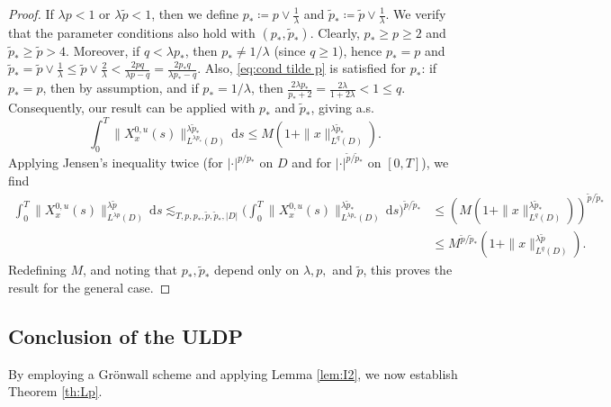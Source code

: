 \documentclass{amsart}
\theoremstyle{plain}
\theoremstyle{remark}
\theoremstyle{plain}
\numberwithin{equation}{section}
\newcommand{\ceqq}{\coloneqq}
\newcommand{\dd}{\,\mathrm{d}}
\begin{document}
\begin{proof}
If $\lambda p<1$ or $\lambda\tilde p<1$, then we define  $p_*\ceqq p\vee \frac{1}{\lambda}$ and $\tilde p_*\ceqq \tilde p\vee \frac{1}{\lambda}$. We verify that the parameter conditions also hold with $(p_*,\tilde p_*)$. Clearly, $p_*\geq p\geq 2$ and $\tilde p_*\geq \tilde p>4$. Moreover, if $q<\lambda p_*$, then $p_*\neq 1/\lambda$ (since $q\geq 1$), hence $p_*=p$ and $\tilde p_*=\tilde p \vee \frac{1}{\lambda}\leq \tilde p\vee \frac{2}{\lambda}<\frac{2pq}{\lambda p-q}=\frac{2p_*q}{\lambda p_*-q}$. Also, \eqref{eq:cond tilde p} is satisfied for $p_*$: if $p_*=p$, then by assumption, and if $p_*=1/\lambda$, then  $\frac{2\lambda p_*}{p_*+2}=\frac{2\lambda}{1+2\lambda}<1\leq q$. 
Consequently, our result can be applied with $p_*$ and $\tilde p_*$, giving a.s.
\[
\int_0^T \|X_x^{0,u}(s)\|_{L^{\lambda p_*}(D)}^{\lambda \tilde p_*}\dd s\leq M(1+\|x\|_{L^q(D)}^{\lambda\tilde p_*}).
\]
Applying Jensen's inequality twice (for $|\cdot|^{ p/ p_*}$ on $D$ and for $|\cdot|^{\tilde p/\tilde p_*}$ on $[0,T]$), we find 
\begin{align*}
\int_0^T \|X_x^{0,u}(s)\|_{L^{\lambda p}(D)}^{\lambda \tilde p}\dd s
    \lesssim_{T,p,p_*,\tilde p,\tilde p_*,|D|}\Big(\int_0^T \|X_x^{0,u}(s)\|_{L^{\lambda p_*}(D)}^{\lambda \tilde p_*}\dd s\Big)^{\tilde p/\tilde p_*}
    &\leq (M(1+\|x\|_{L^q(D)}^{\lambda\tilde p_*}))^{\tilde p/\tilde p_*}\\
    &\leq M^{\tilde p/\tilde p_*}(1+\|x\|_{L^q(D)}^{\lambda\tilde p}).
\end{align*}
Redefining $M$, and noting that $p_*,\tilde p_*$ depend only on $\lambda,p,$ and $\tilde p$, this proves the result for the general case. 
\end{proof}


\subsection{Conclusion of the ULDP}\label{sub:concl Lp}

By employing a Gr\"onwall scheme and applying Lemma \ref{lem:I2}, we now establish Theorem \ref{th:Lp}. 
\end{document}
